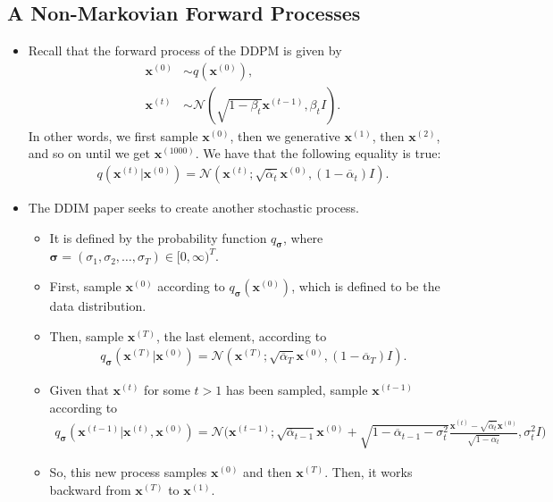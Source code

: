 \documentclass[10pt]{article}
\newcommand{\ve}[1]{\mathbf{#1}}
\newcommand{\ves}[1]{\boldsymbol{#1}}
\newcommand{\mcal}[1]{\mathcal{#1}}
\begin{document}
\subsection{A Non-Markovian Forward Processes}

\begin{itemize}
  \item Recall that the forward process of the DDPM is given by
  \begin{align*}
    \ve{x}^{(0)} &\sim q(\ve{x}^{(0)}),\\
    \ve{x}^{(t)} &\sim \mcal{N}(\sqrt{1 - \beta_t} \ve{x}^{(t-1)}, \beta_t I).
  \end{align*}
  In other words, we first sample $\ve{x}^{(0)}$, then we generative $\ve{x}^{(1)}$, then $\ve{x}^{(2)}$, and so on until we get $\ve{x}^{(1000)}$. We have that the following equality is true:
  \begin{align*}
    q(\ve{x}^{(t)}|\ve{x}^{(0)}) = \mcal{N}(\ve{x}^{(t)}; \sqrt{\overline{\alpha}_t}\ve{x}^{(0)}, (1 - \overline{\alpha}_t) I).
  \end{align*}

  \item The DDIM paper seeks to create another stochastic process.
  \begin{itemize}
    \item It is defined by the probability function $q_{\ves{\sigma}}$, where $\ves{\sigma} = (\sigma_1, \sigma_2, \dotsc, \sigma_T) \in [0,\infty)^T$.
    \item First, sample $\ve{x}^{(0)}$ according to $q_{\ves{\sigma}}(\ve{x}^{(0)})$, which is defined to be the data distribution.
    \item Then, sample $\ve{x}^{(T)}$, the last element, according to
    \begin{align*}
      q_{\ves{\sigma}}(\ve{x}^{(T)}|\ve{x}^{(0)}) = \mcal{N}(\ve{x}^{(T)}; \sqrt{\overline{\alpha}_T}\ve{x}^{(0)}, (1 - \overline{\alpha}_T) I).
    \end{align*}
    \item Given that $\ve{x}^{(t)}$ for some $t > 1$ has been sampled, sample $\ve{x}^{(t-1)}$ according to
    \begin{align*}
      q_{\ves{\sigma}}(\ve{x}^{(t-1)}|\ve{x}^{(t)}, \ve{x}^{(0)}) = \mcal{N}\bigg( \ve{x}^{(t-1)} ; \sqrt{\overline{\alpha}_{t-1}} \ve{x}^{(0)} + \sqrt{1 - \overline{\alpha}_{t-1} - \sigma_t^2 } \frac{\ve{x}^{(t)} - \sqrt{\overline{\alpha}_t} \ve{x}^{(0)}}{\sqrt{1 - \overline{\alpha}_t}}, \sigma_t^2 I \bigg)
    \end{align*}
    \item So, this new process samples $\ve{x}^{(0)}$ and then $\ve{x}^{(T)}$. Then, it works backward from $\ve{x}^{(T)}$ to $\ve{x}^{(1)}$.
  \end{itemize}


\end{itemize}
\end{document}
